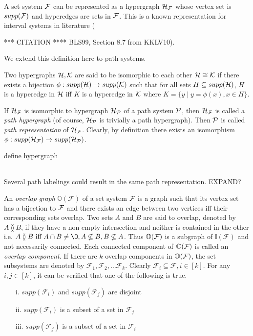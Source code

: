 \documentclass{llncs}
\def\cF{{\cal F}}
\def\cH{{\cal H}}
\def\cK{{\cal K}}
\def\cP{{\cal P}}
\def\F{{\mathcal F}}
\def\H{{\mathcal H}}
\def\bI{\mathbb I}
\def\bO{\mathbb O}
\def\overlap{\between}
\def\cmt{7cm}
\begin{document}
\noindent
A set system $\cF$ can be represented as a hypergraph $\H_\cF$ whose
vertex set is $supp(\cF)$ and hyperedges are sets in $\cF$. This is a
known representation for interval systems in literature (

\parbox{\cmt}
{
*** CITATION ****
BLS99, Section 8.7 from KKLV10).\\} 
We extend this definition here to
path systems.

\noindent
Two hypergraphs $\cH, \cK$ are said to be isomorphic to each other
$\cH \cong \cK$ if there exists a bijection $\phi: supp(\cH)
\rightarrow supp(\cK)$ such that 
for all sets $H \subseteq supp(\cH)$, $H$ is a hyperedge in $\cH$ iff
$K$ is a hyperedge in $\cK$ where $K = \{y \mid y = \phi(x), x \in H\}$.


\noindent
If $\H_\cF$ is isomorphic to hypergraph $\H_\cP$ of a path system $\cP$, then $\H_\cF$ is called a {\em path hypergraph} (of course,
$\H_\cP$ is trivially a path hypergraph). Then $\cP$
is called {\em path representation} of $\H_\cF$. Clearly, by definition there exists an
isomorphism $\phi: supp(\H_\cF) \rightarrow supp(\H_\cP)$.\\

\parbox{\cmt}
{ define hypergraph \\\\
}


\parbox{\cmt} 
{Several path labelings could result in the same path representation. EXPAND?\\}


\noindent
An {\em overlap graph} $\bO(\F)$ of a set system $\cF$ is a graph such
that its vertex set has a bijection to $\cF$ and there exists an edge
between two vertices iff their corresponding sets overlap. Two sets
$A$ and $B$ are said to overlap, denoted by $A \overlap B$, if they
have a non-empty intersection and neither is contained in the other
i.e. $A \overlap B \text{ iff } A \cap B \ne \O, A \nsubseteq B, B
\nsubseteq A$. Thus $\bO(\cF)$ is a subgraph of $\bI(\F)$ and not
necessarily connected. Each connected component of $\bO(\cF)$ is
called an {\em overlap component}. If there are $k$ overlap components
in $\bO(\cF)$, the set subsystems are denoted by $\F_1, \F_2, \ldots
\F_k$. Clearly $\F_i \subseteq \F, i \in [k]$. For any $i, j \in [k]$,
it can be verified that one of the following is true.
\begin{enumerate}
\item[i.] $supp(\F_i)$ and $supp(\F_j)$ are disjoint
\item[ii.] $supp(\F_i)$ is a subset of a set in $\F_j$
\item[iii.] $supp(\F_j)$ is a subset of a set in $\F_i$\\
\end{enumerate}
 
\end{document}
